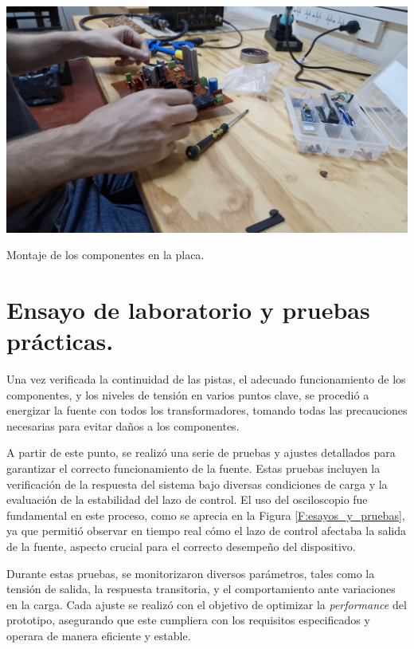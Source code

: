 \begin{foto}[htbp]
    \centering
    \includegraphics[width=\textwidth]{./imagenes/fotos/montaje.jpg}
    \caption{Montaje de los componentes en la placa.}
    \label{F:montaje_componentes}
\end{foto} \par 

\section{Ensayo de laboratorio y pruebas prácticas.}
Una vez verificada la continuidad de las pistas, el adecuado funcionamiento de los componentes, y los niveles de tensión en varios puntos clave, se procedió a energizar la fuente con todos los transformadores, tomando todas las precauciones necesarias para evitar daños a los componentes.\par 
A partir de este punto, se realizó una serie de pruebas y ajustes detallados para garantizar el correcto funcionamiento de la fuente. Estas pruebas incluyen la verificación de la respuesta del sistema bajo diversas condiciones de carga y la evaluación de la estabilidad del lazo de control. El uso del osciloscopio fue fundamental en este proceso, como se aprecia en la Figura \ref{F:esayos_y_pruebas}, ya que permitió observar en tiempo real cómo el lazo de control afectaba la salida de la fuente, aspecto crucial para el correcto desempeño del dispositivo.\par 
Durante estas pruebas, se monitorizaron diversos parámetros, tales como la tensión de salida, la respuesta transitoria, y el comportamiento ante variaciones en la carga. Cada ajuste se realizó con el objetivo de optimizar la \textit{performance} del prototipo, asegurando que este cumpliera con los requisitos especificados y operara de manera eficiente y estable.\par 

